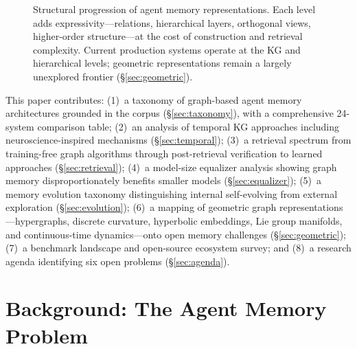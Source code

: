 \documentclass[hf]{ceurart}
\begin{document}
\begin{figure}[t]
\caption{Structural progression of agent memory representations. Each
  level adds expressivity---relations, hierarchical layers, orthogonal
  views, higher-order structure---at the cost of construction and
  retrieval complexity. Current production systems operate at the
  KG and hierarchical levels; geometric representations remain
  a largely unexplored frontier (\S\ref{sec:geometric}).}
\label{fig:progression}
\end{figure}

This paper contributes: (1)~a taxonomy of graph-based agent memory
architectures grounded in the corpus (\S\ref{sec:taxonomy}), with a
comprehensive 24-system comparison table;
(2)~an analysis of temporal KG approaches including neuroscience-inspired
mechanisms (\S\ref{sec:temporal});
(3)~a retrieval spectrum from training-free graph algorithms through
post-retrieval verification to learned approaches
(\S\ref{sec:retrieval});
(4)~a model-size equalizer analysis showing graph memory
disproportionately benefits smaller models (\S\ref{sec:equalizer});
(5)~a memory evolution taxonomy distinguishing internal self-evolving
from external exploration (\S\ref{sec:evolution});
(6)~a mapping of geometric graph representations---hypergraphs, discrete
curvature, hyperbolic embeddings, Lie group manifolds, and continuous-time
dynamics---onto open memory challenges (\S\ref{sec:geometric});
(7)~a benchmark landscape and open-source ecosystem survey; and
(8)~a research agenda identifying six open problems
(\S\ref{sec:agenda}).


\section{Background: The Agent Memory Problem}
\label{sec:background}
\end{document}
